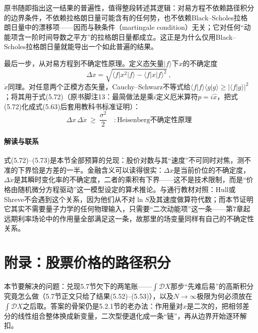 原书随即指出这一结果的普遍性，值得整段转述其逻辑：对易方程不依赖路径积分的边界条件，不依赖拉格朗日量可能含有的任何势，也不依赖Black--Scholes拉格朗日量中的漂移项——因而与鞅条件（martingale condition）无关；它对任何“动能项含一阶时间导数之平方”的拉格朗日量都成立。这正是为什么仅用Black--Scholes拉格朗日量就能导出一个如此普遍的结果。

最后一步，从对易方程到不确定性原理。定义态矢量$\vert f\rangle$下$x$的不确定度
\begin{equation*}
\Delta x=\sqrt{\langle f\vert x^{2}\vert f\rangle-\langle f\vert x\vert f\rangle^{2}}\ ,
\end{equation*}
$\dot{x}$同理。对任意两个正模方态矢量，Cauchy--Schwarz不等式给$\langle f\vert f\rangle\langle g\vert g\rangle\geq\vert\langle f\vert g\rangle\vert^{2}$；将其用于式(5.72)（原书脚注13：最简做法是乘$i$定义厄米算符$p=i\dot{\hat{x}}$，把式(5.72)化成式(5.63)后套用教科书标准证明）：
\begin{equation*}
\Delta x\,\Delta\dot{x}\ \geq\ \frac{\sigma^{2}}{2}\quad:
\text{Heisenberg不确定性原理}
\tag{5.73}
\end{equation*}

\paragraph{解读与联系}
式(5.72)--(5.73)是本节全部预算的兑现：股价对数与其“速度”不可同时对焦，测不准的下界恰是方差的一半。金融含义可以读得很实：$\Delta x$是当前价位的不确定度，$\Delta\dot{x}$是其瞬时变化率的不确定度，二者的乘积有下界——这不是技术限制，而是“价格由随机微分方程驱动”这一模型设定的算术推论。与通行教材对照：Hull或Shreve不会遇到这个关系，因为他们从不对$\ln S$及其速度做算符代数；而本节证明它其实不需要量子力学的任何物理输入，只需要“二次动能项”这一条——第7章起远期利率场论中的作用量全部满足这一条，故那里的场变量同样有自己的不确定性关系。

\section{附录：股票价格的路径积分}

本节要解决的问题：兑现5.7节欠下的两笔账——$\int\mathcal{D}X$那步“先难后易”的高斯积分究竟怎么做（5.7节正文只给了结果(5.52)--(5.53)），以及$N\to\infty$极限为何必须放在$\int\mathcal{D}X$之后取。答案的骨架仍是5.2.1节的老办法：作用量对$x$是二次的，把相邻差分的线性组合整体换成新变量，二次型便退化成一条“链”，再从边界开始逐环解扣。


